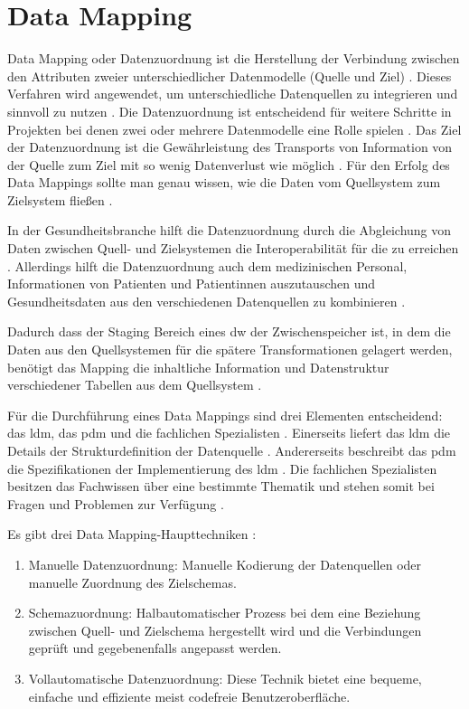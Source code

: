 \section{Data Mapping} \label{subsec:tbasub}

Data Mapping oder Datenzuordnung ist die Herstellung der Verbindung zwischen den Attributen zweier unterschiedlicher Datenmodelle (Quelle und Ziel) \cite{datamappingqs}. Dieses Verfahren wird angewendet, um unterschiedliche Datenquellen zu integrieren und sinnvoll zu nutzen \cite{datamappingastera}. Die Datenzuordnung ist entscheidend für weitere Schritte in Projekten bei denen zwei oder mehrere Datenmodelle eine Rolle spielen \cite{datamappingqs}. Das Ziel der Datenzuordnung ist die Gewährleistung des Transports von Information von der Quelle zum Ziel mit so wenig Datenverlust wie möglich \cite{datamappingastera}. Für den Erfolg des Data Mappings sollte man genau wissen, wie die Daten vom Quellsystem zum Zielsystem fließen \cite{datamappingqs}. 

In der Gesundheitsbranche hilft die Datenzuordnung durch die Abgleichung von Daten zwischen Quell- und Zielsystemen die Interoperabilität für die  zu erreichen \cite{interop, datamappingastera}. Allerdings hilft die Datenzuordnung auch dem medizinischen Personal, Informationen von Patienten und Patientinnen auszutauschen und Gesundheitsdaten aus den verschiedenen Datenquellen zu kombinieren \cite{datamappingastera}.

Dadurch dass der Staging Bereich eines \ac{dw} der Zwischenspeicher ist, in dem die Daten aus den Quellsystemen für die spätere Transformationen gelagert werden, benötigt das Mapping die inhaltliche Information und Datenstruktur verschiedener Tabellen aus dem Quellsystem \cite{datamappingqs, datawarehouse}.

Für die Durchführung eines Data Mappings sind drei Elementen entscheidend: das \ac{ldm}, das \ac{pdm} und die fachlichen Spezialisten \cite{datamappingqs}. Einerseits liefert das \ac{ldm} die Details der Strukturdefinition der Datenquelle \cite{datamappingqs, datamodel}. Andererseits beschreibt das \ac{pdm} die Spezifikationen der Implementierung des \ac{ldm} \cite{datamodel}. Die fachlichen Spezialisten besitzen das Fachwissen über eine bestimmte Thematik und stehen somit bei Fragen und Problemen zur Verfügung \cite{smeitlexicon}.

Es gibt drei Data Mapping-Haupttechniken \cite{datamappingastera}:
\begin{enumerate}
  \item Manuelle Datenzuordnung: Manuelle Kodierung der Datenquellen oder manuelle Zuordnung des Zielschemas.
  \item Schemazuordnung: Halbautomatischer Prozess bei dem eine Beziehung zwischen Quell- und Zielschema hergestellt wird und die Verbindungen geprüft und gegebenenfalls angepasst werden.
  \item Vollautomatische Datenzuordnung: Diese Technik bietet eine bequeme, einfache und effiziente meist codefreie Benutzeroberfläche.
\end{enumerate}

